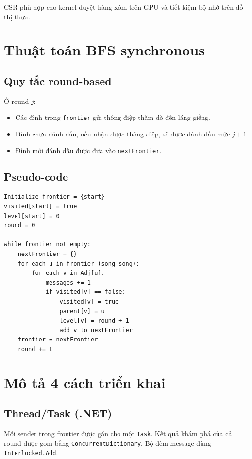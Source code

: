 \documentclass[12pt,a4paper]{article}
\begin{document}
CSR phù hợp cho kernel duyệt hàng xóm trên GPU và tiết kiệm bộ nhớ trên đồ thị thưa.

\section{Thuật toán BFS synchronous}

\subsection{Quy tắc round-based}
Ở round $j$:
\begin{itemize}
    \item Các đỉnh trong \texttt{frontier} gửi thông điệp thăm dò đến láng giềng.
    \item Đỉnh chưa đánh dấu, nếu nhận được thông điệp, sẽ được đánh dấu mức $j+1$.
    \item Đỉnh mới đánh dấu được đưa vào \texttt{nextFrontier}.
\end{itemize}

\subsection{Pseudo-code}
\begin{lstlisting}[language={}, caption={Pseudo-code BFS synchronous (frontier-based)}]
Initialize frontier = {start}
visited[start] = true
level[start] = 0
round = 0

while frontier not empty:
    nextFrontier = {}
    for each u in frontier (song song):
        for each v in Adj[u]:
            messages += 1
            if visited[v] == false:
                visited[v] = true
                parent[v] = u
                level[v] = round + 1
                add v to nextFrontier
    frontier = nextFrontier
    round += 1
\end{lstlisting}

\section{Mô tả 4 cách triển khai}

\subsection{Thread/Task (.NET)}
Mỗi sender trong frontier được gán cho một \texttt{Task}. Kết quả khám phá của cả round
được gom bằng \texttt{ConcurrentDictionary}. Bộ đếm message dùng \texttt{Interlocked.Add}.
\end{document}
